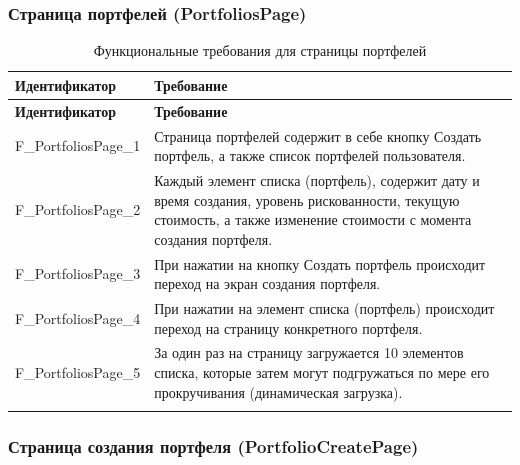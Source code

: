 \documentclass[a4paper, 14pt]{article}
\begin{document}
\subsubsection{Страница портфелей (PortfoliosPage)}

\begin{longtable}{| p{} | p{} |}
    \hline
    \textbf{Идентификатор}          & \textbf{Требование}                                                                                                                                                                \\
    \hline
    \endfirsthead
    \hline
    \textbf{Идентификатор}          & \textbf{Требование}                                                                                                                                                                \\
    \hline
    \endhead

    F\_PortfoliosPage\_1      & Страница портфелей содержит в себе кнопку Создать портфель, а также список портфелей пользователя.                                                                 \\ \hline
    F\_PortfoliosPage\_2      & Каждый элемент списка (портфель), содержит дату и время создания, уровень рискованности, текущую стоимость, а также изменение стоимости с момента создания портфеля.                                                               \\ \hline
    F\_PortfoliosPage\_3      & При нажатии на кнопку Создать портфель происходит переход на экран создания портфеля.                                                                                  \\ \hline
    F\_PortfoliosPage\_4      & При нажатии на элемент списка (портфель) происходит переход на страницу конкретного портфеля.                                                                           \\ \hline
    F\_PortfoliosPage\_5                & За один раз на страницу загружается 10 элементов списка, которые затем могут подгружаться по мере его прокручивания (динамическая загрузка).                             \\ \hline

    \caption{Функциональные требования для страницы портфелей}
\end{longtable}

\subsubsection{Страница создания портфеля (PortfolioCreatePage)}
\end{document}
